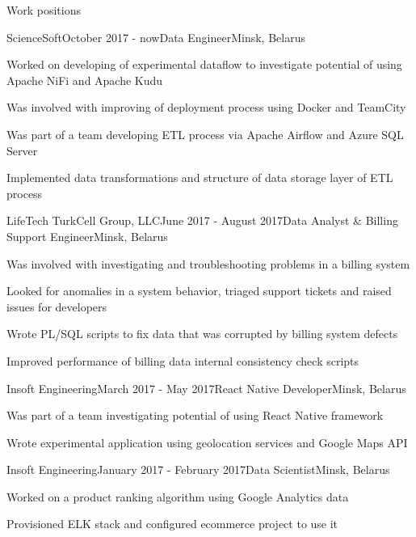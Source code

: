 \documentclass{resume} %
\begin{document}
\begin{rSection}{Work positions}

\begin{rSubsection}{ScienceSoft}{October 2017 - now}{Data Engineer}{Minsk, Belarus}
\item Worked on developing of experimental dataflow to investigate potential of using Apache NiFi and Apache Kudu
\item Was involved with improving of deployment process using Docker and TeamCity
\item Was part of a team developing ETL process via Apache Airflow and Azure SQL Server
\item Implemented data transformations and structure of data storage layer of ETL process
\end{rSubsection}

\begin{rSubsection}{LifeTech TurkCell Group, LLC}{June 2017 - August 2017}{Data Analyst \& Billing Support Engineer}{Minsk, Belarus}
\item Was involved with investigating and troubleshooting problems in a billing system
\item Looked for anomalies in a system behavior, triaged support tickets and raised issues for developers
\item Wrote PL/SQL scripts to fix data that was corrupted by billing system defects
\item Improved performance of billing data internal consistency check scripts
\end{rSubsection}

\begin{rSubsection}{Insoft Engineering}{March 2017 - May 2017}{React Native Developer}{Minsk, Belarus}
\item Was part of a team investigating potential of using React Native framework
\item Wrote experimental application using geolocation services and Google Maps API
\end{rSubsection}

\begin{rSubsection}{Insoft Engineering}{January 2017 - February 2017}{Data Scientist}{Minsk, Belarus}
\item Worked on a product ranking algorithm using Google Analytics data
\item Provisioned ELK stack and configured ecommerce project to use it
\end{rSubsection}


\end{rSection}
\end{document}
